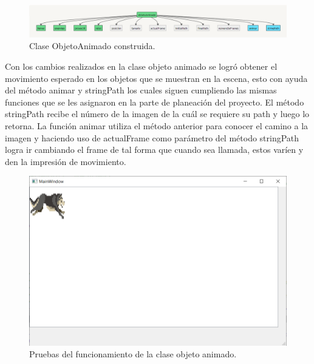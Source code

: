 \documentclass{article}
\begin{document}
\begin{figure}[h]
\includegraphics[scale=0.6]{Images/newObjetoanimado.png}
\centering
\caption{Clase ObjetoAnimado construida.}
\label{fig:newobjetoAnimado}
\end{figure}

\newpage
Con los cambios realizados en la clase objeto animado se logró obtener el movimiento esperado en los objetos que se muestran en la escena, esto con ayuda del método animar y stringPath los cuales siguen cumpliendo las mismas funciones que se les asignaron en la parte de planeación del proyecto. El método stringPath recibe el número de la imagen de la cuál se requiere su path y luego lo retorna. La función animar utiliza el método anterior para conocer el camino a la imagen y haciendo uso de actualFrame como parámetro del método stringPath logra ir cambiando el frame de tal forma que cuando sea llamada, estos varíen y den la impresión de movimiento.

\begin{figure}[h]
\includegraphics[scale=0.6]{Images/animacionInicial.png}
\centering
\caption{Pruebas del funcionamiento de la clase objeto animado.}
\label{fig:animacion1}
\end{figure}
\end{document}
